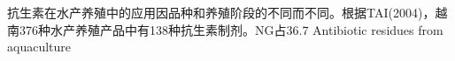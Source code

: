 \documentclass{SCIS2020cn}
\begin{document}
抗生素在水产养殖中的应用因品种和养殖阶段的不同而不同。根据TAI(2004)，越南376种水产养殖产品中有138种抗生素制剂。NG占36.7%
Antibiotic residues from aquaculture
\end{document}
